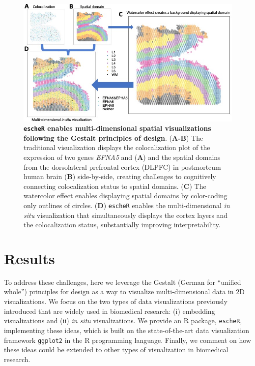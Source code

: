 \documentclass[10pt,twocolumn]{article}
\begin{document}
\begin{figure}[!t]
\begin{center}
\includegraphics[width=\textwidth]{Manuscript/figure/insitu.jpg}
\caption{\small \textbf{\texttt{escheR} enables multi-dimensional spatial visualizations following the Gestalt principles of design}. (\textbf{A-B}) The traditional visualization displays the colocalization plot of the expression of two genes \textit{EFNA5} and  (\textbf{A}) and the spatial domains from the dorsolateral prefrontal cortex (DLPFC) in postmorteum human brain \cite{huukimyers_2023} (\textbf{B}) side-by-side, creating challenges to cognitively connecting colocalization status to spatial domains. (\textbf{C}) The watercolor effect enables displaying spatial domains by color-coding only outlines of circles. (\textbf{D}) \texttt{escheR} enables the multi-dimensional \textit{in situ} visualization that simultaneously displays the cortex layers and the colocalization status, substantially improving interpretability.}
\label{fig:visual} 
\end{center}
\end{figure}


\section{Results}

To address these challenges, here we leverage the Gestalt (German for “unified whole”) principles for design \cite{todorovic_2008, palmer_1999} as a way to visualize multi-dimensional data in 2D visualizations. We focus on the two types of data visualizations previously introduced that are widely used in biomedical research: (i) embedding visualizations and (ii) \textit{in situ} visualizations. We provide an R package, \texttt{escheR}, implementing these ideas, which is built on the state-of-the-art data visualization framework \texttt{ggplot2} in the R programming language. Finally, we comment on how these ideas could be extended to other types of visualization in biomedical research. 
\end{document}
